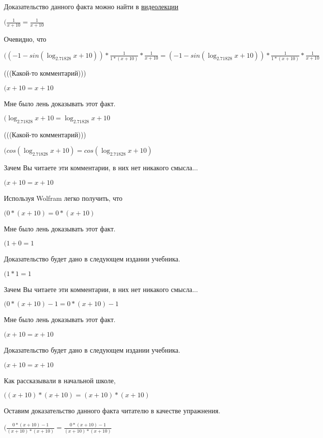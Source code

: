 \documentclass[12pt,a4paper,fleqn]{article}
\theoremstyle{definition}
\begin{document}
Доказательство данного факта можно найти в \href{https://www.youtube.com/watch?v=dQw4w9WgXcQ}{видеолекции}

$(\frac{ 1 }{ x  +  10 }
 = \frac{ 1 }{ x  +  10 }
$

Очевидно, что

$(( -1  - sin(\log_{ 2.71828 }{ x  +  10 })) * \frac{ 1 }{ 1  * ( x  +  10 )}
 * \frac{ 1 }{ x  +  10 }
 = ( -1  - sin(\log_{ 2.71828 }{ x  +  10 })) * \frac{ 1 }{ 1  * ( x  +  10 )}
 * \frac{ 1 }{ x  +  10 }
$

(((Какой-то комментарий)))

$( x  +  10  =  x  +  10 $

Мне было лень доказывать этот факт.

$(\log_{ 2.71828 }{ x  +  10 } = \log_{ 2.71828 }{ x  +  10 }$

(((Какой-то комментарий)))

$(cos(\log_{ 2.71828 }{ x  +  10 }) = cos(\log_{ 2.71828 }{ x  +  10 })$

Зачем Вы читаете эти комментарии, в них нет никакого смысла...

$( x  +  10  =  x  +  10 $

Используя Wolfram легко получить, что

$( 0  * ( x  +  10 ) =  0  * ( x  +  10 )$

Мне было лень доказывать этот факт.

$( 1  +  0  =  1 $

Доказательство будет дано в следующем издании учебника.

$( 1  *  1  =  1 $

Зачем Вы читаете эти комментарии, в них нет никакого смысла...

$( 0  * ( x  +  10 ) -  1  =  0  * ( x  +  10 ) -  1 $

Мне было лень доказывать этот факт.

$( x  +  10  =  x  +  10 $

Доказательство будет дано в следующем издании учебника.

$( x  +  10  =  x  +  10 $

Как рассказывали в начальной школе,

$(( x  +  10 ) * ( x  +  10 ) = ( x  +  10 ) * ( x  +  10 )$

Оставим доказательство данного факта читателю в качестве упражнения.

$(\frac{ 0  * ( x  +  10 ) -  1 }{( x  +  10 ) * ( x  +  10 )}
 = \frac{ 0  * ( x  +  10 ) -  1 }{( x  +  10 ) * ( x  +  10 )}
$
\end{document}
